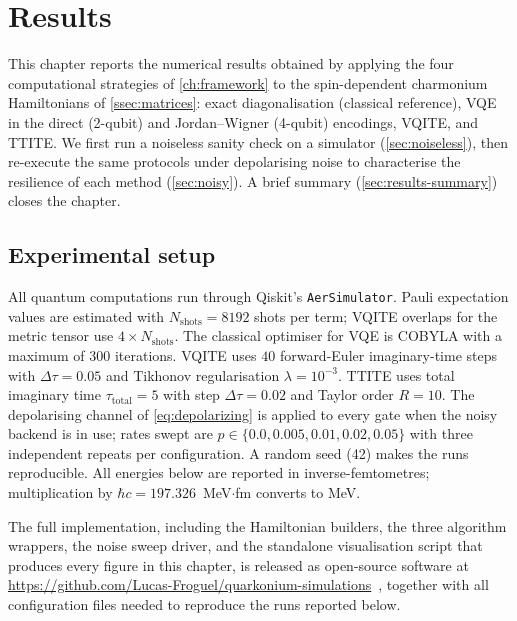 \chapter{Results}
\label{ch:results}

This chapter reports the numerical results obtained by applying the
four computational strategies of \cref{ch:framework} to the
spin-dependent charmonium Hamiltonians of \cref{ssec:matrices}: exact
diagonalisation (classical reference), VQE in the direct (2-qubit) and
Jordan--Wigner (4-qubit) encodings, VQITE, and TTITE. We first run a
noiseless sanity check on a simulator (\cref{sec:noiseless}), then
re-execute the same protocols under depolarising noise to characterise
the resilience of each method (\cref{sec:noisy}). A brief summary
(\cref{sec:results-summary}) closes the chapter.

\section{Experimental setup}
\label{sec:results-setup}

All quantum computations run through Qiskit's
\texttt{AerSimulator}. Pauli expectation values are
estimated with $N_{\mathrm{shots}} = 8192$ shots per term; VQITE
overlaps for the metric tensor use $4\!\times\! N_{\mathrm{shots}}$. The
classical optimiser for VQE is COBYLA with a maximum of $300$
iterations. VQITE uses $40$ forward-Euler imaginary-time steps with
$\Delta\tau = 0.05$ and Tikhonov regularisation $\lambda = 10^{-3}$.
TTITE uses total imaginary time $\tau_{\mathrm{total}} = 5$ with step
$\Delta\tau = 0.02$ and Taylor order $R = 10$. The depolarising channel
of \cref{eq:depolarizing} is applied to every gate when the noisy
backend is in use; rates swept are
$p \in \{0.0, 0.005, 0.01, 0.02, 0.05\}$ with three independent repeats
per configuration. A random seed (42) makes the runs reproducible. All
energies below are reported in inverse-femtometres; multiplication by
$\hbar c = 197.326$~MeV$\cdot$fm converts to MeV.

The full implementation, including the Hamiltonian builders, the three
algorithm wrappers, the noise sweep driver, and the standalone
visualisation script that produces every figure in this chapter, is
released as open-source software at
\url{https://github.com/Lucas-Froguel/quarkonium-simulations}~\cite{froguel_quarksim},
together with all configuration files needed to reproduce the runs
reported below.


